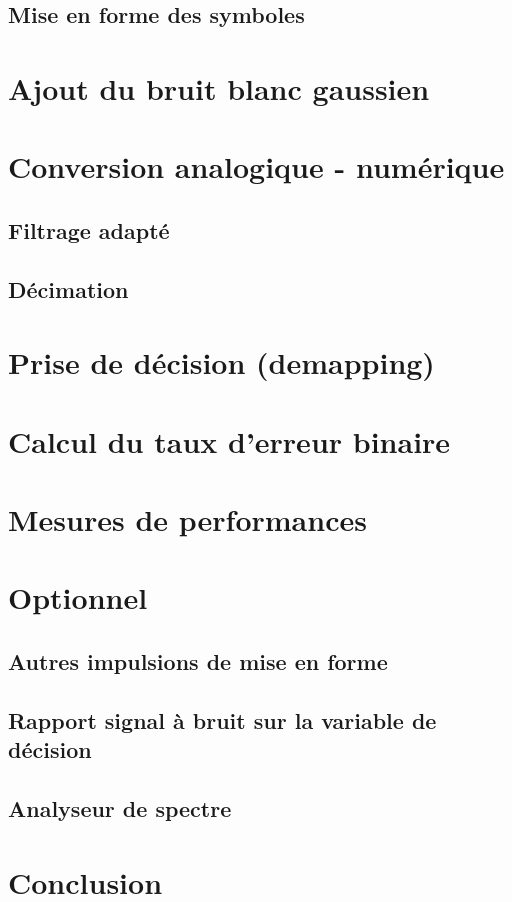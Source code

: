 \documentclass{acm_proc_article-sp}
\begin{document}
\subsection{Mise en forme des symboles}


\section{Ajout du bruit blanc gaussien}


\section{Conversion analogique - numérique}
\subsection{Filtrage adapté}
\subsection{Décimation}


\section{Prise de décision (demapping)}


\section{Calcul du taux d'erreur binaire}


\section{Mesures de performances}


\section{Optionnel}
\subsection{Autres impulsions de mise en forme}
\subsection{Rapport signal à bruit sur la variable de décision}
\subsection{Analyseur de spectre}


\section{Conclusion}


\nocite{*}

\balancecolumns
\end{document}
